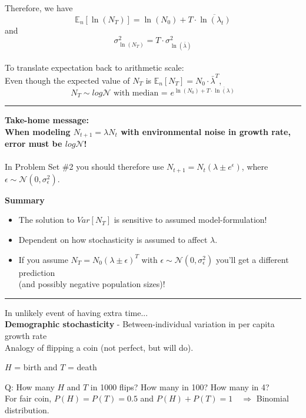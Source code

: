 \documentclass{article}
\newcommand{\note}[1]{\colorbox{gray!20}{#1}}
\begin{document}
Therefore, we have
\begin{equation*}
	\mathbb{E}_n[\ln(N_T)]=\ln(N_0)+ T \cdot \overline{\ln(\lambda_t)}
\end{equation*}
and
\begin{equation*}
\sigma_{\ln (N_T)}^2 = T\cdot \sigma_{\ln(\bar{\lambda})}^2
\end{equation*}
\\
To translate expectation back to arithmetic scale:\\
Even though the expected value of $N_T$ is $\mathbb{E}_n[N_T]= N_0 \cdot \bar{\lambda}^T$,
\begin{equation*}
	N_T \sim log\mathcal{N} \text{ with median = } e^{\ln(N_0)+T\cdot \overline{\ln(\lambda)}}
\end{equation*}

\rule[0.5ex]{\linewidth}{1pt}

\textbf{Take-home message:}\\
\textbf{When modeling $N_{t+1}=\lambda N_t$ with environmental noise in growth rate, error must be $log\mathcal{N}$!}\\
\\
In Problem Set \#2 you should therefore use $N_{t+1}=N_t (\lambda \pm e^\epsilon)$, where $\epsilon \sim \mathcal{N}(0,\sigma_\epsilon^2)$.\\

\pagebreak

\textbf{Summary}
\begin{itemize}
\item The solution to $Var[N_T]$ is sensitive to assumed model-formulation!
\item Dependent on how stochasticity is assumed to affect $\lambda$.
\item If you assume $N_{T}=N_0 (\lambda \pm \epsilon)^T$ with $\epsilon \sim \mathcal{N}(0,\sigma_\epsilon^2)$ you'll get a different prediction\\
(and possibly negative population sizes)!
\end{itemize}

\rule[0.5ex]{\linewidth}{1pt}

\note{In unlikely event of having extra time...}\\
\textbf{Demographic stochasticity} - Between-individual variation in per capita growth rate\\
Analogy of flipping a coin (not perfect, but will do).
\begin{center}
	$H$ = birth and $T$ = death
\end{center}
\note{Q:} How many $H$ and $T$ in 1000 flips?  How many in 100?  How many in 4?\\
For fair coin, $P(H)=P(T)=0.5$ and $P(H)+P(T)=1 \quad \Rightarrow $ Binomial distribution.
\end{document}
